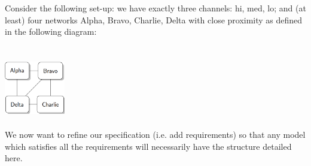 \documentclass{article}
\begin{document}
\begin{enumerate}[(a)]
        \newpage
        \begin{flushleft}
            Consider the following set-up: we have exactly three channels: hi, med, lo; and (at least) four networks Alpha, Bravo, Charlie, Delta with close proximity as defined in the following diagram:
        \end{flushleft}

        \begin{centering}\hspace*{1pt}\\\includegraphics[width=100px, height = 100px]{network2.png}\end{centering}
        We now want to refine our specification (i.e. add requirements) so that any model which satisfies all the requirements will necessarily have the structure detailed here.
        

\end{enumerate}
\end{document}
